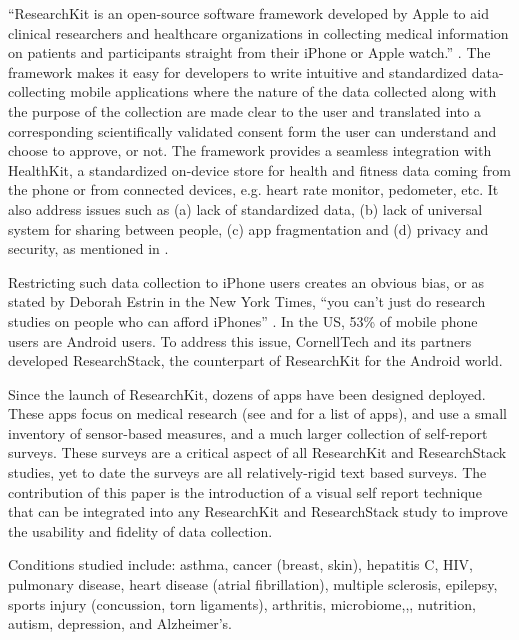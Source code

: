 \documentclass{acm_proc_article-sp}
\begin{document}
``ResearchKit is an open-source software framework developed by Apple to aid clinical researchers and healthcare organizations in collecting medical information on patients and participants straight from their iPhone or Apple watch.'' \cite{Bionetworks_undated-yw}. The framework makes it easy for developers to write intuitive and standardized data-collecting mobile applications where the nature of the data collected along with the purpose of the collection are made clear to the user and translated into a corresponding scientifically validated consent form the user can understand and choose to approve, or not. The framework provides a seamless integration with HealthKit, a standardized on-device store for health and fitness data coming from the phone or from connected devices, e.g. heart rate monitor, pedometer, etc.
It also address issues such as (a) lack of standardized data, (b) lack of universal system for sharing between people, (c) app fragmentation and (d) privacy and security, as mentioned in \cite{noauthor_undated-ej}.

Restricting such data collection to iPhone users creates an obvious bias, or as stated by Deborah Estrin in the New York Times,  ``you can't just do research studies on people who can afford iPhones'' \cite{Apple_undated-rz}. In the US, 53\% of mobile phone users are Android users.
To address this issue, CornellTech and its partners developed ResearchStack, the counterpart of ResearchKit for the Android world. 

Since the launch of ResearchKit, dozens of apps have been designed deployed. These apps focus on medical research (see \cite{noauthor_undated-xa} and \cite{Tangmunarunkit2015-hu} for a list of apps), and use a small inventory of sensor-based measures, and a much larger collection of self-report surveys. These surveys are a critical aspect of all ResearchKit and ResearchStack studies, yet to date the surveys are all relatively-rigid text based surveys.   The contribution of this paper is the introduction of a visual self report technique that can be integrated into any ResearchKit and ResearchStack study to improve the usability and fidelity of data collection.

Conditions studied include: asthma, cancer (breast, skin), hepatitis C, HIV, pulmonary disease, heart disease (atrial fibrillation), multiple sclerosis, epilepsy, sports injury (concussion, torn ligaments), arthritis, microbiome,,, nutrition, autism, depression, and Alzheimer's.
\end{document}
